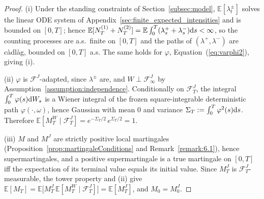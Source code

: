 \documentclass[11pt,a4paper]{article}
\numberwithin{equation}{section}
\theoremstyle{remark}
\theoremstyle{definition}
\newcommand{\E}{{\mathbb{E}}}
\newcommand{\dd}{{\rm d}}
\newcommand{\Fc}{\mathcal{F}}
\begin{document}
{\begin{proof}
(i) Under the standing constraints of Section~\ref{subsec:model}, $\E[\lambda^{\pm}_t]$ solves the linear
ODE system of Appendix~\ref{sec:finite_expected_intensities} and is bounded on $[0,T]$; hence
$\E[N^{(1)}_T+N^{(2)}_T]=\E\int_0^T(\lambda^{+}_s+\lambda^{-}_s)\dd s<\infty$, so the counting
processes are a.s.\ finite on $[0,T]$ and the paths of $(\lambda^{+},\lambda^{-})$ are c\`adl\`ag,
bounded on $[0,T]$ a.s. The same holds for $\varphi$, Equation~(\ref{eq:varphi2}), giving (i).

(ii) $\varphi$ is $\Fc^{J}$-adapted, since $\lambda^{\pm}$ are, and $W\perp\Fc^{J}_\infty$ by
Assumption~\ref{assumption:independence}. Conditionally on $\Fc^{J}_T$, the integral $\int_0^T\varphi(s)\dd W_s$ is a Wiener
integral of the frozen square-integrable deterministic path $\varphi(\cdot,\omega)$, hence Gaussian
with mean $0$ and variance $\Sigma_T:=\int_0^T\varphi^2(s)\dd s$. Therefore
$\E[M^{W}_T\mid\Fc^{J}_T]=e^{-\Sigma_T/2}\,e^{\Sigma_T/2}=1$.

(iii) $M$ and $M^{J}$ are strictly positive local martingales (Proposition~\ref{prop:martingaleConditions}
and Remark~\ref{remark:6.1}), hence supermartingales, and a positive supermartingale is a true martingale on
$[0,T]$ iff the expectation of its terminal value equals its initial value. Since $M^{J}_T$ is
$\Fc^{J}_T$-measurable, the tower property and (ii) give $\E[M_T]=\E\big[M^{J}_T\,\E[M^{W}_T\mid
\Fc^{J}_T]\big]=\E[M^{J}_T]$, and $M_0=M^{J}_0$.
\end{proof}

}
\end{document}

